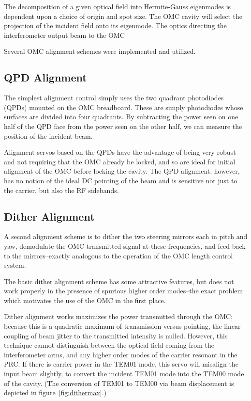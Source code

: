 The decomposition of a given optical field into Hermite-Gauss
eigenmodes is dependent upon a choice of origin and spot size.  The
OMC cavity will select the projection of the incident field onto its
eigenmode.  The optics directing the interferometer output beam to the
OMC

Several OMC alignment schemes were implemented and utilized.

\subsection{QPD Alignment}

The simplest alignment control simply uses the two quadrant
photodiodes (QPDs) mounted on the OMC breadboard.
These are simply photodiodes whose surfaces are divided into
four quadrants.  By subtracting the power seen on one half
of the QPD face from the power seen on the other half, we 
can measure the position of the incident beam.

Alignment servos based on the QPDs have the advantage of being very
robust and not requiring that the OMC already be locked, and so are
ideal for initial alignment of the OMC before locking the cavity.  The
QPD alignment, however, has no notion of the ideal DC pointing of the
beam and is sensitive not just to the carrier, but also the RF
sidebands.

\subsection{Dither Alignment}

A second alignment scheme is to dither the two steering mirrors each
in pitch and yaw, demodulate the OMC transmitted signal at these
frequencies, and feed back to the mirrors--exactly analogous to the
operation of the OMC length control system. 

The basic dither alignment scheme has some attractive features, but
does not work properly in the presence of spurious higher order
modes--the exact problem which motivates the use of the OMC in the 
first place.

Dither alignment works maximizes the power transmitted through the
OMC; because this is a quadratic maximum of transmission versus
pointing, the linear coupling of beam jitter to the transmitted
intensity is nulled.  However, this technique cannot distinguish
between the optical field coming from the interferometer arms, and any
higher order modes of the carrier resonant in the PRC.  If there is
carrier power in the TEM01 mode, this servo will misalign the input
beam slightly, to convert the incident TEM01 mode into the TEM00 mode
of the cavity.  (The conversion of TEM01 to TEM00 via beam displacement
is depicted in figure~\ref{fig:dithermax}.)

